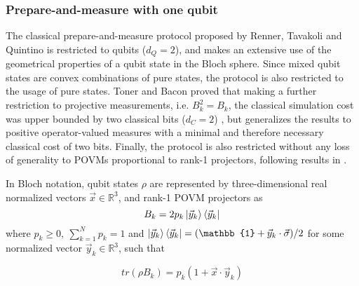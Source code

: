 \subsubsection{Prepare-and-measure with one qubit}\label{section:protocol_pm}
The classical prepare-and-measure protocol proposed by Renner, Tavakoli and Quintino \cite{renner2023} is restricted to qubits ($d_Q=2$), and makes an extensive use of the geometrical properties of a qubit state in the Bloch sphere. Since mixed qubit states are convex combinations of pure states, the protocol is also restricted to the usage of pure states. Toner and Bacon proved that making a further restriction to projective measurements, i.e. $B_{k}^{2} = B_{k}$, the classical simulation cost was upper bounded by two classical bits ($d_C=2$) \cite{toner2003}, but \cite{renner2023} generalizes the results to positive operator-valued measures with a minimal and therefore necessary classical cost of two bits. Finally, the protocol is also restricted without any loss of generality to POVMs proportional to rank-1 projectors, following results in \cite{barrett2002}.

In Bloch notation, qubit states $\rho$ are represented by three-dimensional real normalized vectors $\vec{x} \in \mathbb{R}^{3}$, and rank-1 POVM projectors as 
\begin{equation}\label{eq:rank1_povm}
B_{k} = 2p_{k}\ket{\vec{y}_{k}}\bra{\vec{y}_{k}}
\end{equation}
where $p_{k}\ge0,\ \sum_{k=1}^{N}p_{k}=1$ and $\ket{\vec{y}_{k}}\bra{\vec{y}_{k}} = (\mathbb{1} + \vec{y}_{k} \cdot \vec{\sigma})/2$ for some normalized vector $\vec{y}_{k} \in \mathbb{R}^{3}$, such that

\begin{equation}
tr(\rho B_{k}) = p_{k}(1 + \vec{x} \cdot \vec{y}_{k}) 
\end{equation}

